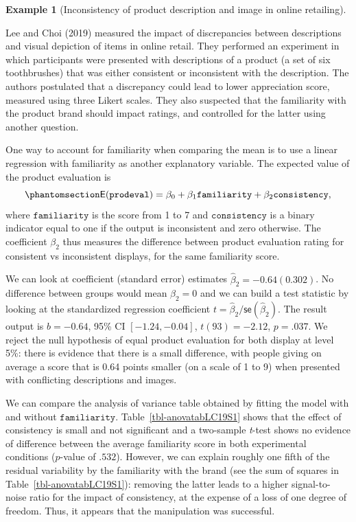 \documentclass[
  11pt,
  letterpaper,
]{scrbook}
\theoremstyle{definition}
\newtheorem{example}{Example}[chapter]
\theoremstyle{definition}
\theoremstyle{remark}
\begin{document}
\begin{example}[Inconsistency of product description and image in online
retailing]\protect\hypertarget{exm-leechoi}{}\label{exm-leechoi}

Lee and Choi (2019) measured the impact of discrepancies between
descriptions and visual depiction of items in online retail. They
performed an experiment in which participants were presented with
descriptions of a product (a set of six toothbrushes) that was either
consistent or inconsistent with the description. The authors postulated
that a discrepancy could lead to lower appreciation score, measured
using three Likert scales. They also suspected that the familiarity with
the product brand should impact ratings, and controlled for the latter
using another question.

One way to account for familiarity when comparing the mean is to use a
linear regression with familiarity as another explanatory variable. The
expected value of the product evaluation is
\begin{equation}\phantomsection\label{eq-vS}{
\mathsf{E}(\texttt{prodeval}) = \beta_0 + \beta_1 \texttt{familiarity} + \beta_2 \texttt{consistency}, 
}\end{equation} where \(\texttt{familiarity}\) is the score from 1 to 7
and \(\texttt{consistency}\) is a binary indicator equal to one if the
output is inconsistent and zero otherwise. The coefficient \(\beta_2\)
thus measures the difference between product evaluation rating for
consistent vs inconsistent displays, for the same familiarity score.

We can look at coefficient (standard error) estimates
\(\widehat{\beta}_2 = -0.64 (0.302)\). No difference between groups
would mean \(\beta_2=0\) and we can build a test statistic by looking at
the standardized regression coefficient
\(t = \widehat{\beta}_2/\mathsf{se}(\widehat{\beta}_2)\). The result
output is \(b = -0.64\), 95\% CI \([-1.24, -0.04]\), \(t(93) = -2.12\),
\(p = .037\). We reject the null hypothesis of equal product evaluation
for both display at level 5\%: there is evidence that there is a small
difference, with people giving on average a score that is 0.64 points
smaller (on a scale of 1 to 9) when presented with conflicting
descriptions and images.

We can compare the analysis of variance table obtained by fitting the
model with and without \(\texttt{familiarity}\).
Table~\ref{tbl-anovatabLC19S1} shows that the effect of consistency is
small and not significant and a two-sample \emph{t}-test shows no
evidence of difference between the average familiarity score in both
experimental conditions (\(p\)-value of \(.532\)). However, we can
explain roughly one fifth of the residual variability by the familiarity
with the brand (see the sum of squares in
Table~\ref{tbl-anovatabLC19S1}): removing the latter leads to a higher
signal-to-noise ratio for the impact of consistency, at the expense of a
loss of one degree of freedom. Thus, it appears that the manipulation
was successful.


\end{example}
\end{document}
